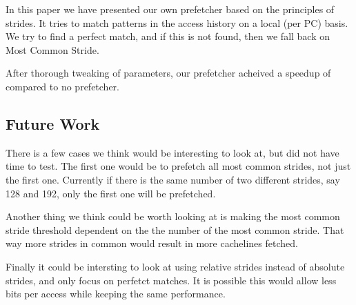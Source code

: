 In this paper we have presented our own prefetcher based on the principles of strides. It tries to match patterns in the access history on a local (per PC) basis. We try to find a perfect match, and if this is not found, then we fall back on Most Common Stride.

After thorough tweaking of parameters, our prefetcher acheived a speedup of \speedup compared to no prefetcher. 

\subsection{Future Work}
There is a few cases we think would be interesting to look at, but did not have
time to test. The first one would be to prefetch all most common strides, not
just the first one. Currently if there is the same number of two different
strides, say 128 and 192, only the first one will be prefetched.

Another thing we think could be worth looking at is making the most common
stride threshold dependent on the the number of the most common stride.
That way more strides in common would result in more cachelines fetched.

Finally it could be intersting to look at using relative strides instead of
absolute strides, and only focus on perfetct matches. It is possible this would
allow less bits per access while keeping the same performance.
